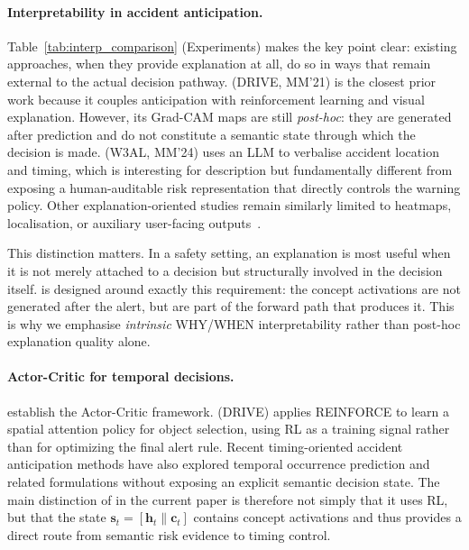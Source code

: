 \paragraph{Interpretability in accident anticipation.}
Table~\ref{tab:interp_comparison} (Experiments) makes the key point clear:
existing approaches, when they provide explanation at all, do so in ways that
remain external to the actual decision pathway. \citet{ref2} (DRIVE, MM'21) is
the closest prior work because it couples anticipation with reinforcement
learning and visual explanation. However, its Grad-CAM maps are still
\emph{post-hoc}: they are generated after prediction and do not constitute a
semantic state through which the decision is made. \citet{liao2024and}
(W3AL, MM'24) uses an LLM to verbalise accident location and timing, which is
interesting for description but fundamentally different from exposing a
human-auditable risk representation that directly controls the warning policy.
Other explanation-oriented studies remain similarly limited to heatmaps,
localisation, or auxiliary user-facing outputs~\citep{ref102,karim2023attention}.

This distinction matters. In a safety setting, an explanation is most useful
when it is not merely attached to a decision but structurally involved in the
decision itself. \method{} is designed around exactly this requirement: the
concept activations are not generated after the alert, but are part of the
forward path that produces it. This is why we emphasise \emph{intrinsic}
WHY/WHEN interpretability rather than post-hoc explanation quality alone.

\paragraph{Actor-Critic for temporal decisions.}
\citet{sutton2018reinforcement} establish the Actor-Critic framework.
\citet{ref2} (DRIVE) applies REINFORCE to learn a spatial attention
policy for object selection, using RL as a training signal rather than
for optimizing the final alert rule. Recent timing-oriented accident
anticipation methods have also explored temporal occurrence prediction and
related formulations without exposing an explicit semantic decision state. The
main distinction of \caac{} in the current paper is therefore not simply that
it uses RL, but that the state $\mathbf{s}_t=[\mathbf{h}_t\|\mathbf{c}_t]$
contains concept activations and thus provides a direct route from semantic
risk evidence to timing control.

